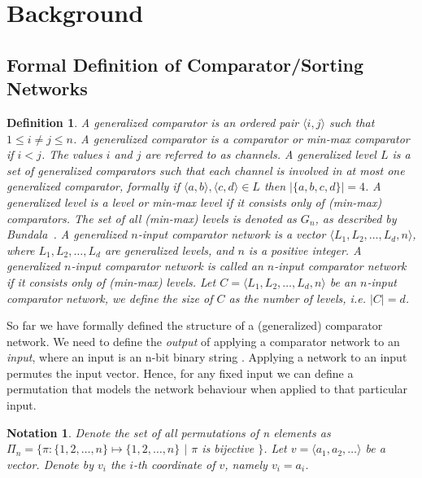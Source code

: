 \documentclass[13pt,a4paper]{article}
\newtheorem{definition}[theorem]{Definition}
\newtheorem{notation}[theorem]{Notation}
\begin{document}
\section{ Background }

\subsection{ Formal Definition of Comparator/Sorting Networks }

\begin{definition}
\label{ComparatorNetworkDefinition}
A \emph{generalized comparator} is an ordered pair $\langle i, j \rangle$ such that $1 \leq i \neq j \leq n$. A generalized comparator is a \emph{comparator} or \emph{min-max comparator} if $i < j$. The values $i$ and $j$ are referred to as \emph{channels}.
A \emph{generalized level} $L$ is a set of generalized comparators such that each channel is involved in at most one generalized comparator, formally if $\langle a, b \rangle, \langle c, d \rangle \in L$ then $\lvert \{ a, b, c, d \} \lvert = 4 $. A generalized level is a \emph{level} or \emph{min-max level} if it consists only of (min-max) comparators. The set of all (min-max) levels is denoted as $G_n$, as described by Bundala~\cite{BundalaCCSZ14_Optimal_Depth}.
A \emph{generalized $n$-input comparator network} is a vector $\langle L_1, L_2, \dots, L_d, n \rangle $, where $L_1, L_2, \dots, L_d$ are generalized levels, and $n$ is a positive integer. A generalized $n$-input comparator network is called an \emph{$n$-input comparator network} if it consists only of (min-max) levels. Let $C = \langle L_1, L_2, \dots, L_d, n \rangle$ be an $n$-input comparator network, we define the size of $C$ as the number of levels, i.e. $|C| = d$.
\end{definition}

So far we have formally defined the structure of a (generalized) comparator network. We need to define the \emph{output} of applying a comparator network to an \emph{input}, where an input is an n-bit binary string \cite{Knuth73}. Applying a network to an input permutes the input vector. Hence, for any fixed input we can define a permutation that models the network behaviour when applied to that particular input.

\begin{notation}
\label{PermutationDefinition}
Denote the set of all permutations of n elements as $\Pi_n = \{ \pi : \{1, 2, \dots, n\} \longmapsto \{1, 2, \dots, n\}$ $\lvert$ $\pi$ is bijective $\}$. Let $v = \langle a_1, a_2, \dots \rangle$ be a vector. Denote by $v_i$ the $i$-th coordinate of $v$, namely $v_i = a_i$.
\end{notation}
\end{document}
